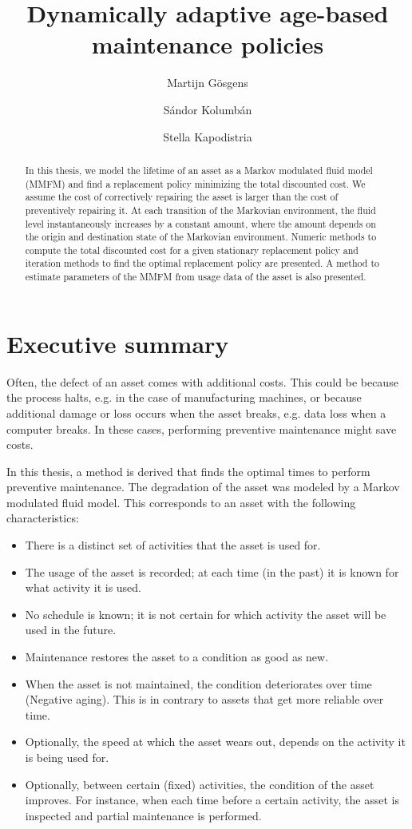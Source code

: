 

\frontmatter
\title{Dynamically adaptive age-based maintenance policies}
\author{Martijn G\"{o}sgens\\
\and
S\'{a}ndor Kolumb\'{a}n\\
\and
Stella Kapodistria
}



\begin{abstract}
	In this thesis, we model the lifetime of an asset as a Markov modulated fluid model (MMFM) and find a replacement policy minimizing the total discounted cost.
	We assume the cost of correctively repairing the asset is larger than the cost of preventively repairing it.
	At each transition of the Markovian environment, the fluid level instantaneously increases by a constant amount, where the amount depends on the origin and destination state of the Markovian environment.
	Numeric methods to compute the total discounted cost for a given stationary replacement policy and iteration methods to find the optimal replacement policy are presented.
	A method to estimate parameters of the MMFM from usage data of the asset is also presented.
\end{abstract}

\chapter*{Executive summary}
Often, the defect of an asset comes with additional costs.
This could be because the process halts, e.g. in the case of manufacturing machines, or because additional damage or loss occurs when the asset breaks, e.g. data loss when a computer breaks.
In these cases, performing preventive maintenance might save costs.

In this thesis, a method is derived that finds the optimal times to perform preventive maintenance.
The degradation of the asset was modeled by a Markov modulated fluid model.
This corresponds to an asset with the following characteristics:
\begin{itemize}
	\item There is a distinct set of activities that the asset is used for.
	\item The usage of the asset is recorded; at each time (in the past) it is known for what activity it is used.
	\item No schedule is known; it is not certain for which activity the asset will be used in the future.
	\item Maintenance restores the asset to a condition as good as new.
	\item When the asset is not maintained, the condition deteriorates over time (Negative aging).
	This is in contrary to assets that get more reliable over time.
	\item Optionally, the speed at which the asset wears out, depends on the activity it is being used for.
	\item Optionally, between certain (fixed) activities, the condition of the asset improves.
	For instance, when each time before a certain activity, the asset is inspected and partial maintenance is performed.
\end{itemize}

